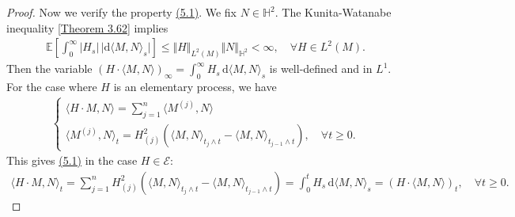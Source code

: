 \documentclass{article}
\numberwithin{equation}{section}
\newcommand{\E}{\mathbb{E}}
\renewcommand{\d}{\mathrm{d}}
\theoremstyle{plain}
\theoremstyle{definition}
\begin{document}
\begin{proof}
Now we verify the property \hyperref[eq:5.1]{(5.1)}. We fix $N\in\mathbb{H}^2$. The Kunita-Watanabe inequality [\hyperref[thm:3.62]{Theorem 3.62}] implies
\begin{align*}
	\E\left[\int_0^\infty\vert H_s\vert\,\vert \d\langle M,N\rangle_s\vert\right]\leq\Vert H\Vert_{L^2(M)}\Vert N\Vert_{\mathbb{H}^2} < \infty,\quad\forall H\in L^2(M).
\end{align*}
Then the variable $\left(H\cdot\langle M,N\rangle\right)_\infty = \int_0^\infty H_s\,\d \langle M,N\rangle_s$ is well-defined and in $L^1$. For the case where $H$ is an elementary process, we have
\begin{align*}
	\begin{cases}
		\langle H\cdot M,N\rangle = \sum_{j=1}^n\langle M^{(j)},N\rangle\\
		\langle M^{(j)},N\rangle_t = H_{(j)}^2\left(\langle M,N\rangle_{t_j\wedge t}-\langle M,N\rangle_{t_{j-1}\wedge t}\right),\quad \forall t\geq 0.
	\end{cases}
\end{align*}
This gives \hyperref[eq:5.1]{(5.1)} in the case $H\in\mathscr{E}$:
\begin{align*}
	\langle H\cdot M,N\rangle_t=\sum_{j=1}^nH_{(j)}^2\left(\langle M,N\rangle_{t_j\wedge t}-\langle M,N\rangle_{t_{j-1}\wedge t}\right) = \int_0^t H_s\,\d \langle M,N\rangle_s=(H\cdot\langle M,N\rangle)_t,\quad\forall t\geq 0.
\end{align*}


\end{proof}
\end{document}
